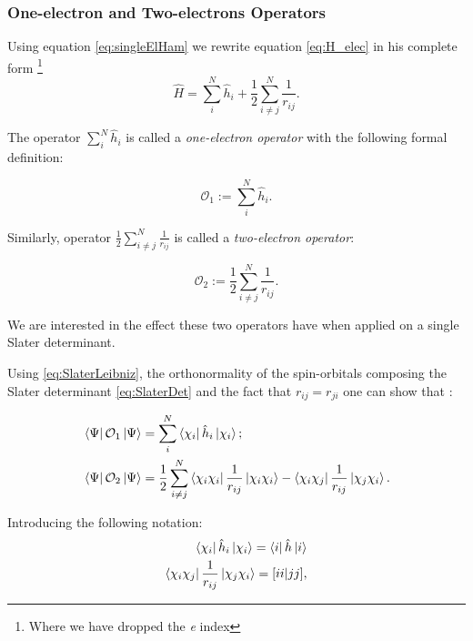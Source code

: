 \documentclass[a4paper,12pt]{article}
\newcommand{\jsqrt}[2]{\bqty{ #1 #1 | #2 #2 }}
\begin{document}
\subsubsection{One-electron and Two-electrons Operators}

Using  equation \eqref{eq:singleElHam} we rewrite equation \eqref{eq:H_elec} in his complete form \footnote{Where we have dropped the \textit{e} index}
\begin{equation}
	\hat{H} = \sum_{i}^{N} \hat{h}_{i} + \frac{1}{2} \sum_{i \neq j}^{N} \frac{1}{r_{ij}}.
\end{equation}

The operator $\sum_{i}^{N} \hat{h}_{i}$ is called a \textit{one-electron operator} with the following formal definition:

\begin{equation}\label{eq:singleEl}
	\mathcal{O}_{1} := \sum_{i}^{N} \hat{h}_{i}.
\end{equation}

Similarly, operator $\frac{1}{2} \sum_{i \neq j}^{N} \frac{1}{r_{ij}}$ is called a \textit{two-electron operator}:

\begin{equation}
	\mathcal{O}_{2} := \frac{1}{2} \sum_{i \neq j}^{N} \frac{1}{r_{ij}}.
\end{equation}

We are interested in the effect these two operators have when applied on a single Slater determinant.

Using \eqref{eq:SlaterLeibniz}, the orthonormality of the spin-orbitals composing the Slater determinant \eqref{eq:SlaterDet} and the fact that $r_{ij} = r_{ji}$ one can show that \cite[p.74-81]{Attila}:

\begin{align}
	& \bra{\Psi} \mathcal{O}_{1} \ket{\Psi} = \sum_{i}^{N} \bra{\chi_{i}} \hat{h}_i \ket{\chi_{i}} ;\\
	& \bra{\Psi} \mathcal{O}_{2} \ket{\Psi} = \frac{1}{2} \sum_{i \neq j}^{N} \bra{\chi_i \chi_i} \frac{1}{r_{ij}} \ket{ \chi_{i} \chi_{i}} - \bra{\chi_i \chi_j} \frac{1}{r_{ij}} \ket{ \chi_{j} \chi_{i}}.
\end{align}

Introducing the following notation:
\begin{align}
	\bra{\chi_{i}} \hat{h}_i \ket{\chi_{i}} = \bra{i} \hat{h} \ket{i}
	\\
	\bra{\chi_{i} \chi_{j}} \frac{1}{r_{ij}} \ket{ \chi_{j} \chi_{i}} = \jsqrt{i}{j}, \label{eq:squareNotation}
\end{align}
\end{document}
